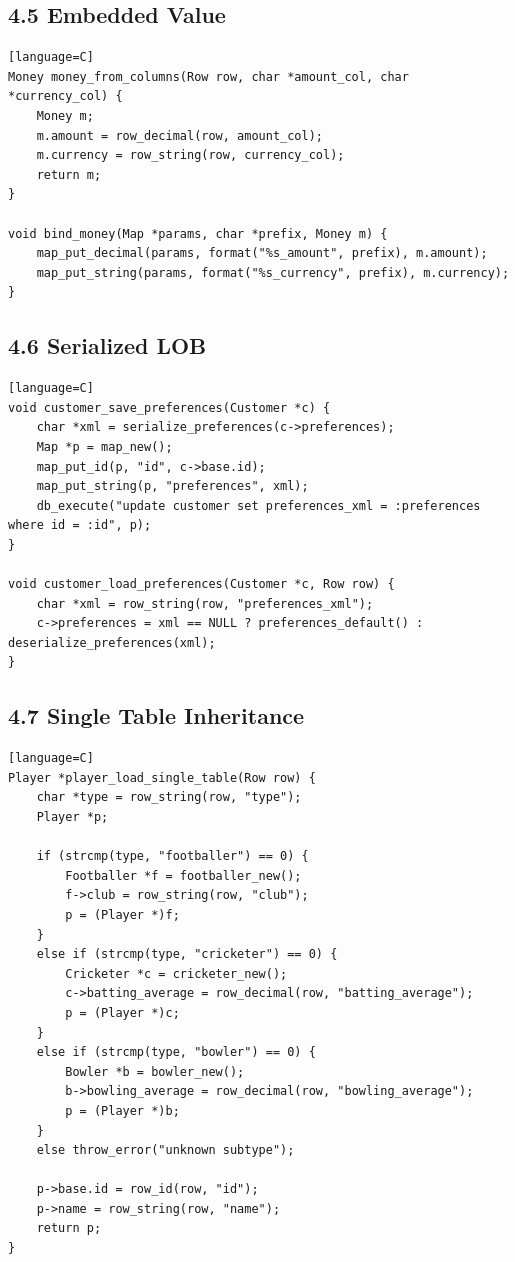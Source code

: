 \documentclass[11pt]{article}
\begin{document}
\subsection{4.5 Embedded Value}\label{embedded-value}

\begin{verbatim}[language=C]
Money money_from_columns(Row row, char *amount_col, char *currency_col) {
    Money m;
    m.amount = row_decimal(row, amount_col);
    m.currency = row_string(row, currency_col);
    return m;
}

void bind_money(Map *params, char *prefix, Money m) {
    map_put_decimal(params, format("%s_amount", prefix), m.amount);
    map_put_string(params, format("%s_currency", prefix), m.currency);
}
\end{verbatim}

\subsection{4.6 Serialized LOB}\label{serialized-lob}

\begin{verbatim}[language=C]
void customer_save_preferences(Customer *c) {
    char *xml = serialize_preferences(c->preferences);
    Map *p = map_new();
    map_put_id(p, "id", c->base.id);
    map_put_string(p, "preferences", xml);
    db_execute("update customer set preferences_xml = :preferences where id = :id", p);
}

void customer_load_preferences(Customer *c, Row row) {
    char *xml = row_string(row, "preferences_xml");
    c->preferences = xml == NULL ? preferences_default() : deserialize_preferences(xml);
}
\end{verbatim}

\subsection{4.7 Single Table
Inheritance}\label{single-table-inheritance}

\begin{verbatim}[language=C]
Player *player_load_single_table(Row row) {
    char *type = row_string(row, "type");
    Player *p;

    if (strcmp(type, "footballer") == 0) {
        Footballer *f = footballer_new();
        f->club = row_string(row, "club");
        p = (Player *)f;
    }
    else if (strcmp(type, "cricketer") == 0) {
        Cricketer *c = cricketer_new();
        c->batting_average = row_decimal(row, "batting_average");
        p = (Player *)c;
    }
    else if (strcmp(type, "bowler") == 0) {
        Bowler *b = bowler_new();
        b->bowling_average = row_decimal(row, "bowling_average");
        p = (Player *)b;
    }
    else throw_error("unknown subtype");

    p->base.id = row_id(row, "id");
    p->name = row_string(row, "name");
    return p;
}
\end{verbatim}
\end{document}
